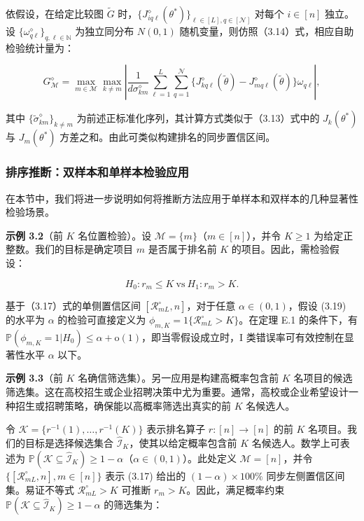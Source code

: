 依假设，在给定比较图 $\widetilde{G}$ 时，$\{J_{iq\ell}^{\diamond}(\theta^{*})\}_{\ell \in [L], q \in [\mathcal{N}]}$ 对每个 $i \in [n]$ 独立。设 $\{\omega_{q\ell}^{\diamond}\}_{q, \ell \in \mathbb{N}}$ 为独立同分布 $N(0,1)$ 随机变量，则仿照（3.14）式，相应自助检验统计量为：

$$
G_{\mathcal{M}}^{\diamond} = \max_{m \in \mathcal{M}} \max_{k \neq m} \left| \frac{1}{d \sigma_{km}^{\diamond}} \sum_{\ell = 1}^{L} \sum_{q = 1}^{\mathcal{N}} \{J_{kq\ell}^{\diamond}(\widetilde{\theta}) - J_{mq\ell}^{\diamond}(\widetilde{\theta})\} \omega_{q\ell} \right|,
$$

其中 $\{\widetilde{\sigma}_{km}^{\diamond}\}_{k \neq m}$ 为前述正标准化序列，其计算方式类似于（3.13）式中的 $J_{k}(\theta^{*})$ 与 $J_{m}(\theta^{*})$ 方差之和。由此可类似构建排名的同步置信区间。


\subsubsection{排序推断：双样本和单样本检验应用}

在本节中，我们将进一步说明如何将推断方法应用于单样本和双样本的几种显著性检验场景。

\textbf{示例 3.2}（前 $K$ 名位置检验）。设 $\mathcal{M} = \{m\}$（$m \in [n]$），并令 $K \geq 1$ 为给定正整数。我们的目标是确定项目 $m$ 是否属于排名前 $K$ 的项目。因此，需检验假设：

\[
H_{0}:r_{m}\leq K\mathrm{~vs~}H_{1}:r_{m} > K. \tag{3.19}
\]

基于（3.17）式的单侧置信区间 $[\mathcal{R}_{mL}^{\circ}, n]$，对于任意 $\alpha \in (0,1)$，假设 (3.19) 的水平为 $\alpha$ 的检验可直接定义为 $\phi_{m,K} = 1\{\mathcal{R}_{mL}^{\circ} > K\}$。在定理 E.1 的条件下，有 $\mathbb{P}(\phi_{m,K} = 1|H_{0}) \leq \alpha + \mathrm{o}(1)$，即当零假设成立时，I 类错误率可有效控制在显著性水平 $\alpha$ 以下。

\textbf{示例 3.3}（前 $K$ 名确信筛选集）。另一应用是构建高概率包含前 $K$ 名项目的候选筛选集。这在高校招生或企业招聘决策中尤为重要。通常，高校或企业希望设计一种招生或招聘策略，确保能以高概率筛选出真实的前 $K$ 名候选人。

令 $\mathcal{K} = \{r^{- 1}(1),\ldots ,r^{- 1}(K)\}$ 表示排名算子 $r:[n]\to [n]$ 的前 $K$ 名项目。我们的目标是选择候选集合 $\widehat{\mathcal{I}}_K$，使其以给定概率包含前 $K$ 名候选人。数学上可表述为 $\mathbb{P}(\mathcal{K}\subseteq \widehat{\mathcal{I}}_K)\geq 1 - \alpha$（$\alpha \in (0,1)$）。此处定义 $\mathcal{M} = [n]$，并令 $\{[\mathcal{R}_{mL}^{\circ},n],m\in [n]\}$ 表示 (3.17) 给出的 $(1 - \alpha)\times 100\%$ 同步左侧置信区间集。易证不等式 $\mathcal{R}_{mL}^{\circ} > K$ 可推断 $r_m > K$。因此，满足概率约束 $\mathbb{P}(\mathcal{K}\subseteq \widehat{\mathcal{I}}_K)\geq 1 - \alpha$ 的筛选集为：

